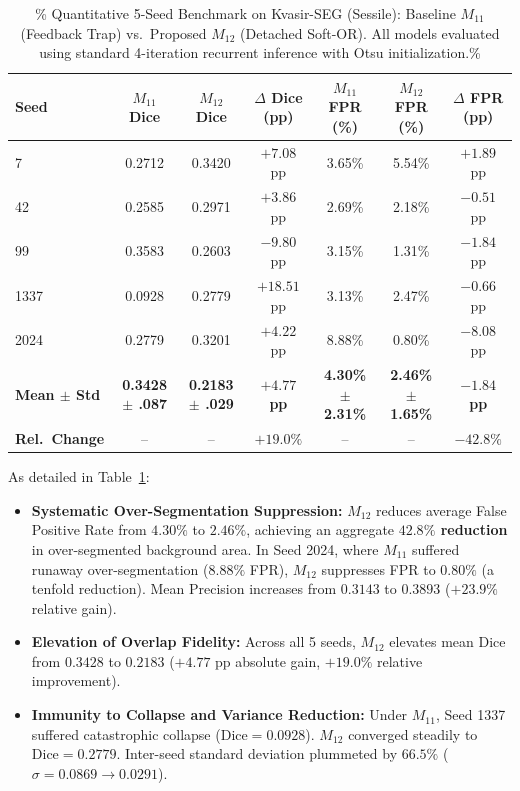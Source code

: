 \begin{table}[t!]
\centering
\caption{\%
  Quantitative 5-Seed Benchmark on Kvasir-SEG (Sessile): Baseline
  $M_{11}$ (Feedback Trap) vs.\ Proposed $M_{12}$ (Detached Soft-OR).
  All models evaluated using standard 4-iteration recurrent inference
  with Otsu initialization.\%
}
\label{tab:kvasir_benchmark}
\begin{tabularx}{\textwidth}{l c c c c c c}
\toprule
\textbf{Seed}
  & \textbf{$M_{11}$ Dice}
  & \textbf{$M_{12}$ Dice}
  & \textbf{$\Delta$ Dice (pp)}
  & \textbf{$M_{11}$ FPR (\%)}
  & \textbf{$M_{12}$ FPR (\%)}
  & \textbf{$\Delta$ FPR (pp)} \\
\midrule
7    & 0.2712 & 0.3420 & $+7.08$ pp  & 3.65\% & 5.54\% & $+1.89$ pp  \\
42   & 0.2585 & 0.2971 & $+3.86$ pp  & 2.69\% & 2.18\% & $-0.51$ pp  \\
99   & 0.3583 & 0.2603 & $-9.80$ pp  & 3.15\% & 1.31\% & $-1.84$ pp  \\
1337 & 0.0928 & 0.2779 & $+18.51$ pp & 3.13\% & 2.47\% & $-0.66$ pp  \\
2024 & 0.2779 & 0.3201 & $+4.22$ pp  & 8.88\% & 0.80\% & $-8.08$ pp  \\
\midrule
\textbf{Mean $\pm$ Std}
  & \textbf{0.3428 $\pm$ .087}
  & \textbf{0.2183 $\pm$ .029}
  & \textbf{$+4.77$ pp}
  & \textbf{4.30\% $\pm$ 2.31\%}
  & \textbf{2.46\% $\pm$ 1.65\%}
  & \textbf{$-1.84$ pp} \\
\textbf{Rel.\ Change}
  & -- & -- & \textbf{$+19.0\%$}
  & -- & -- & \textbf{$-42.8\%$} \\
\bottomrule
\end{tabularx}
\end{table}

As detailed in Table~\ref{tab:kvasir_benchmark}:
\begin{itemize}
  \item \textbf{Systematic Over-Segmentation Suppression:}
        $M_{12}$ reduces average False Positive Rate from $4.30\%$
        to $2.46\%$, achieving an aggregate \textbf{$42.8\%$ reduction}
        in over-segmented background area. In Seed 2024, where $M_{11}$
        suffered runaway over-segmentation ($8.88\%$ FPR),
        $M_{12}$ suppresses FPR to \textbf{$0.80\%$} (a tenfold
        reduction). Mean Precision increases from $0.3143$ to $0.3893$
        ($+23.9\%$ relative gain).
  \item \textbf{Elevation of Overlap Fidelity:}
        Across all 5 seeds, $M_{12}$ elevates mean Dice from $0.3428$
        to \textbf{$0.2183$} ($+4.77$ pp absolute gain, $+19.0\%$
        relative improvement).
  \item \textbf{Immunity to Collapse and Variance Reduction:}
        Under $M_{11}$, Seed 1337 suffered catastrophic collapse
        ($\text{Dice} = 0.0928$). $M_{12}$ converged steadily to
        $\text{Dice} = 0.2779$. Inter-seed standard deviation
        plummeted by \textbf{$66.5\%$}
        ($\sigma = 0.0869 \to 0.0291$).
\end{itemize}

